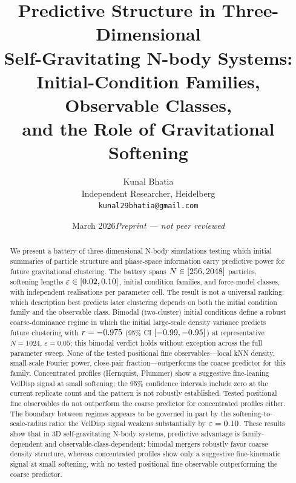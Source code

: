 \documentclass[11pt,a4paper]{article}
\title{Predictive Structure in Three-Dimensional\\
       Self-Gravitating N-body Systems:\\
       Initial-Condition Families, Observable Classes,\\
       and the Role of Gravitational Softening}
\author{Kunal Bhatia\\
\small Independent Researcher, Heidelberg\\
\small \texttt{kunal29bhatia@gmail.com}}
\date{March 2026\quad\textit{Preprint --- not peer reviewed}}
\newcommand{\heps}{\varepsilon}
\begin{document}
\maketitle

\begin{abstract}
We present a battery of \TotalRuns{} three-dimensional N-body simulations
testing which initial summaries of particle structure and phase-space
information carry predictive power for future gravitational clustering.
The battery spans $N \in [256{}, 2048{}]$ particles,
softening lengths $\heps \in [\EpsMin{}, \EpsMax{}]$, \NICs{} initial
condition families, and \NModels{} force-model classes, with \NReplicates{}
independent realisations per parameter cell.
The result is not a universal ranking: which description best predicts
later clustering depends on both the initial condition family and the
observable class.
Bimodal (two-cluster) initial conditions define a robust coarse-dominance
regime in which the initial large-scale density variance predicts future
clustering with $r = -0.975{}$ (95\% CI
$[-0.99{}, -0.95{}]$) at representative
$N = 1024$, $\heps = 0.05$; this bimodal verdict holds without exception across the
full parameter sweep.
None of the tested positional fine observables---local kNN density, small-scale
Fourier power, close-pair fraction---outperforms the coarse predictor for
this family.
Concentrated profiles (Hernquist, Plummer) show a suggestive fine-leaning VelDisp
signal at small softening; the 95\% confidence intervals include zero
at the current replicate count and the pattern is not robustly established.
Tested positional fine observables do not outperform the coarse predictor
for concentrated profiles either.
The boundary between regimes appears to be governed in part by the
softening-to-scale-radius ratio: the VelDisp signal weakens substantially
by $\heps = \EpsMax{}$.
These results show that in 3D self-gravitating N-body systems,
predictive advantage is family-dependent and observable-class-dependent:
bimodal mergers robustly favor coarse density structure, whereas
concentrated profiles show only a suggestive fine-kinematic signal at
small softening, with no tested positional fine observable outperforming
the coarse predictor.
\end{abstract}

\clearpage
\tableofcontents
\clearpage

\end{document}
